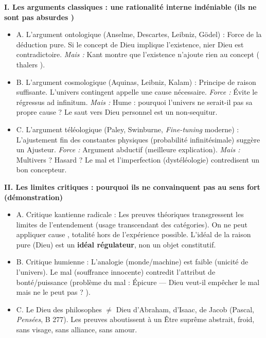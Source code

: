 \documentclass[11pt]{article}
\begin{document}
\begin{exoresolu}
\textbf{I. Les arguments classiques : une rationalité interne indéniable (ils ne sont pas \guillemotleft absurdes \guillemotright)}
\begin{itemize}
    \item A. L'argument ontologique (Anselme, Descartes, Leibniz, Gödel) : Force de la déduction pure. Si le concept de Dieu implique l'existence, nier Dieu est contradictoire. \textit{Mais :} Kant montre que l'existence n'ajoute rien au concept ( thalers \guillemotright).
    \item B. L'argument cosmologique (Aquinas, Leibniz, Kalam) : Principe de raison suffisante. L'univers contingent appelle une cause nécessaire. \textit{Force :} Évite le régressus ad infinitum. \textit{Mais :} Hume : pourquoi l'univers ne serait-il pas sa propre cause ? Le saut vers \guillemotleft Dieu personnel \guillemotright est un non-sequitur.
    \item C. L'argument téléologique (Paley, Swinburne, \emph{Fine-tuning} moderne) : L'ajustement fin des constantes physiques (probabilité infinitésimale) suggère un Ajusteur. \textit{Force :} Argument abductif (meilleure explication). \textit{Mais :} Multivers ? Hasard ? Le mal et l'imperfection (dystéléologie) contredisent un \guillemotleft bon \guillemotright concepteur.
\end{itemize}

\textbf{II. Les limites critiques : pourquoi ils ne \guillemotleft convainquent \guillemotright pas au sens fort (démonstration)}
\begin{itemize}
    \item A. Critique kantienne radicale : Les preuves théoriques transgressent les limites de l'entendement (usage transcendant des catégories). On ne peut appliquer \guillemotleft cause \guillemotright, \guillemotleft totalité \guillemotright hors de l'expérience possible. \guillemotleft L'idéal de la raison pure \guillemotright (Dieu) est un \textbf{idéal régulateur}, non un objet constitutif.
    \item B. Critique humienne : L'analogie (monde/machine) est faible (unicité de l'univers). Le mal (souffrance innocente) contredit l'attribut de bonté/puissance (problème du mal : \guillemotleft Épicure \guillemotright — \guillemotleft Dieu veut-il empêcher le mal mais ne le peut pas ? \guillemotright).
    \item C. Le \guillemotleft Dieu des philosophes \guillemotright $\neq$ \guillemotleft Dieu d'Abraham, d'Isaac, de Jacob \guillemotright (Pascal, \emph{Pensées}, B 277). Les preuves aboutissent à un \guillemotleft Être suprême \guillemotright abstrait, froid, sans visage, sans alliance, sans amour.
\end{itemize}


\end{exoresolu}
\end{document}
